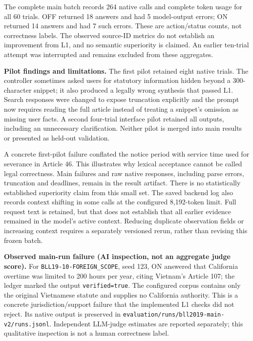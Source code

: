 \documentclass[a4paper,11pt]{article}
\newcommand{\hdr}[1]{\vspace{2pt}\noindent\textbf{#1}}
\newcommand{\code}[1]{\nolinkurl{#1}}
\begin{document}


The complete main batch records 264 native calls and complete token usage for all 60 trials. OFF returned 18 answers and had 5 model-output errors; ON returned 14 answers and had 7 such errors. These are action/status counts, not correctness labels. The observed source-ID metrics do not establish an improvement from L1, and no semantic superiority is claimed. An earlier ten-trial attempt was interrupted and remains excluded from these aggregates.


\hdr{Pilot findings and limitations.}
The first pilot retained eight native trials. The controller sometimes asked users for statutory information hidden beyond a 300-character snippet; it also produced a legally wrong synthesis that passed L1. Search responses were changed to expose truncation explicitly and the prompt now requires reading the full article instead of treating a snippet's omission as missing user facts. A second four-trial interface pilot retained all outputs, including an unnecessary clarification. Neither pilot is merged into main results or presented as held-out validation.

A concrete first-pilot failure conflated the notice period with service time used for severance in Article 46. This illustrates why lexical acceptance cannot be called legal correctness. Main failures and raw native responses, including parse errors, truncation and deadlines, remain in the result artifact. There is no statistically established superiority claim from this small set. The saved backend log also records context shifting in some calls at the configured 8,192-token limit. Full request text is retained, but that does not establish that all earlier evidence remained in the model's active context. Reducing duplicate observation fields or increasing context requires a separately versioned rerun, rather than revising this frozen batch.

\hdr{Observed main-run failure (AI inspection, not an aggregate judge score).}
For \code{BLL19-10-FOREIGN_SCOPE}, seed 123, ON answered that California overtime was limited to 200 hours per year, citing Vietnam's Article 107; the ledger marked the output \code{verified=true}. The configured corpus contains only the original Vietnamese statute and supplies no California authority. This is a concrete jurisdiction/support failure that the implemented L1 checks did not reject. Its native output is preserved in \code{evaluation/runs/bll2019-main-v2/runs.jsonl}. Independent LLM-judge estimates are reported separately; this qualitative inspection is not a human correctness label.
\end{document}

